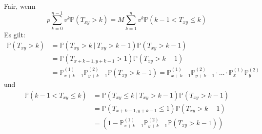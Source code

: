 \begin{itemize}
\[	\]
	Fair, wenn \[
	p\sum_{k=0}^{n-1}v^k\mathds{P}(T_{xy}>k)=M\sum_{k=1}^{n}v^k\mathds{P}(k-1<T_{xy}\le k) 
	\]
	Es gilt: 
	\begin{equation*}
	\begin{aligned}
		\mathds{P}(T_{xy}>k) &= \mathds{P}(T_{xy}>k~|~T_{xy}>k-1)\mathds{P}(T_{xy}>k-1)\\
		&= \mathds{P}(T_{x+k-1,y+k-1}>1)\mathds{P}(T_{xy}>k-1)\\
		&=\mathds{P}_{x+k-1}^{(1)}\mathds{P}_{y+k-1}^{(2)}\mathds{P}(T_{xy}>k-1)=\mathds{P}_{x+k-1}^{(1)}\mathds{P}_{y+k-1}^{(2)}\cdot \dots \cdot \mathds{P}_x^{(1)}\mathds{P}_y^{(2)}
	\end{aligned}
	\end{equation*}
	und
	\begin{equation*}
	\begin{aligned}
		\mathds{P}(k-1<T_{xy}\le k) &= \mathds{P}(T_{xy}\le k~|~T_{xy}>k-1)\mathds{P}(T_{xy}>k-1)\\
		&= \mathds{P}(T_{x+k-1,y+k-1}\le 1)\mathds{P}(T_{xy}>k-1)\\
		&=(1-\mathds{P}_{x+k-1}^{(1)}\mathds{P}_{y+k-1}^{(2)}\mathds{P}(T_{xy}>k-1))
	\end{aligned}
	\end{equation*}
\end{itemize}


